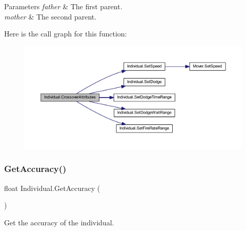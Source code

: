 \begin{DoxyParams}{Parameters}
{\em father} & The first parent.\\
\hline
{\em mother} & The second parent.\\
\hline
\end{DoxyParams}
Here is the call graph for this function\+:\nopagebreak
\begin{figure}[H]
\begin{center}
\leavevmode
\includegraphics[width=350pt]{class_individual_a874acf4e26980a4e97fe5301a5c019a8_cgraph}
\end{center}
\end{figure}
\mbox{\label{class_individual_a5d4fb02c8072b931ffde1a03afb26271}} 
\subsubsection{\texorpdfstring{Get\+Accuracy()}{GetAccuracy()}}
{\footnotesize\ttfamily float Individual.\+Get\+Accuracy (\begin{DoxyParamCaption}{ }\end{DoxyParamCaption})}



Get the accuracy of the individual. 

